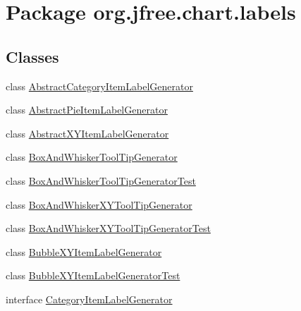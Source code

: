 \hypertarget{namespaceorg_1_1jfree_1_1chart_1_1labels}{}\section{Package org.\+jfree.\+chart.\+labels}
\label{namespaceorg_1_1jfree_1_1chart_1_1labels}
\subsection*{Classes}
\begin{DoxyCompactItemize}
\item 
class \mbox{\hyperlink{classorg_1_1jfree_1_1chart_1_1labels_1_1_abstract_category_item_label_generator}{Abstract\+Category\+Item\+Label\+Generator}}
\item 
class \mbox{\hyperlink{classorg_1_1jfree_1_1chart_1_1labels_1_1_abstract_pie_item_label_generator}{Abstract\+Pie\+Item\+Label\+Generator}}
\item 
class \mbox{\hyperlink{classorg_1_1jfree_1_1chart_1_1labels_1_1_abstract_x_y_item_label_generator}{Abstract\+X\+Y\+Item\+Label\+Generator}}
\item 
class \mbox{\hyperlink{classorg_1_1jfree_1_1chart_1_1labels_1_1_box_and_whisker_tool_tip_generator}{Box\+And\+Whisker\+Tool\+Tip\+Generator}}
\item 
class \mbox{\hyperlink{classorg_1_1jfree_1_1chart_1_1labels_1_1_box_and_whisker_tool_tip_generator_test}{Box\+And\+Whisker\+Tool\+Tip\+Generator\+Test}}
\item 
class \mbox{\hyperlink{classorg_1_1jfree_1_1chart_1_1labels_1_1_box_and_whisker_x_y_tool_tip_generator}{Box\+And\+Whisker\+X\+Y\+Tool\+Tip\+Generator}}
\item 
class \mbox{\hyperlink{classorg_1_1jfree_1_1chart_1_1labels_1_1_box_and_whisker_x_y_tool_tip_generator_test}{Box\+And\+Whisker\+X\+Y\+Tool\+Tip\+Generator\+Test}}
\item 
class \mbox{\hyperlink{classorg_1_1jfree_1_1chart_1_1labels_1_1_bubble_x_y_item_label_generator}{Bubble\+X\+Y\+Item\+Label\+Generator}}
\item 
class \mbox{\hyperlink{classorg_1_1jfree_1_1chart_1_1labels_1_1_bubble_x_y_item_label_generator_test}{Bubble\+X\+Y\+Item\+Label\+Generator\+Test}}
\item 
interface \mbox{\hyperlink{interfaceorg_1_1jfree_1_1chart_1_1labels_1_1_category_item_label_generator}{Category\+Item\+Label\+Generator}}
\item 

\end{DoxyCompactItemize}
